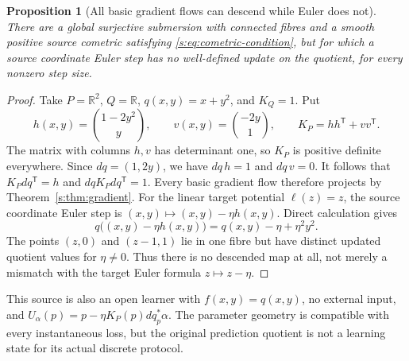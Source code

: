 \documentclass[11pt]{article}
\newtheorem{proposition}[theorem]{Proposition}
\theoremstyle{definition}
\theoremstyle{remark}\newtheorem{remark}[theorem]{Remark}
\newcommand{\R}{\mathbb R}
\begin{document}
\begin{proposition}[All basic gradient flows can descend while Euler does not]
\label{s:prop:euler-obstruction}
There are a global surjective submersion with connected fibres and a smooth
positive source cometric satisfying \eqref{s:eq:cometric-condition}, but for
which a source coordinate Euler step has no well-defined update on the
quotient, for every nonzero step size.
\end{proposition}
\begin{proof}
Take $P=\R^2$, $Q=\R$, $q(x,y)=x+y^2$, and $K_Q=1$. Put
\[
 h(x,y)=\binom{1-2y^2}{y},\qquad
 v(x,y)=\binom{-2y}{1},\qquad K_P=hh^{\mathsf T}+vv^{\mathsf T}.
\]
The matrix with columns $h,v$ has determinant one, so $K_P$ is positive
definite everywhere. Since $dq=(1,2y)$, we have $dq\,h=1$ and $dq\,v=0$.
It follows that $K_Pdq^{\mathsf T}=h$ and $dqK_Pdq^{\mathsf T}=1$.
Every basic gradient flow therefore projects by
Theorem~\ref{s:thm:gradient}. For the linear target potential $\ell(z)=z$,
the source coordinate Euler step is $(x,y)\mapsto(x,y)-\eta h(x,y)$.
Direct calculation gives
\begin{equation}\label{s:eq:euler-failure}
 q\bigl((x,y)-\eta h(x,y)\bigr)
       =q(x,y)-\eta+\eta^2y^2.
\end{equation}
The points $(z,0)$ and $(z-1,1)$ lie in one fibre but have distinct updated
quotient values for $\eta\ne0$. Thus there is no descended map at all,
not merely a mismatch with the target Euler formula $z\mapsto z-\eta$.
\end{proof}
This source is also an open learner with $f(x,y)=q(x,y)$, no external input,
and $U_\alpha(p)=p-\eta K_P(p)dq_p^*\alpha$. The parameter geometry is
compatible with every instantaneous loss, but the original prediction
quotient is not a learning state for its actual discrete protocol.
\end{document}
